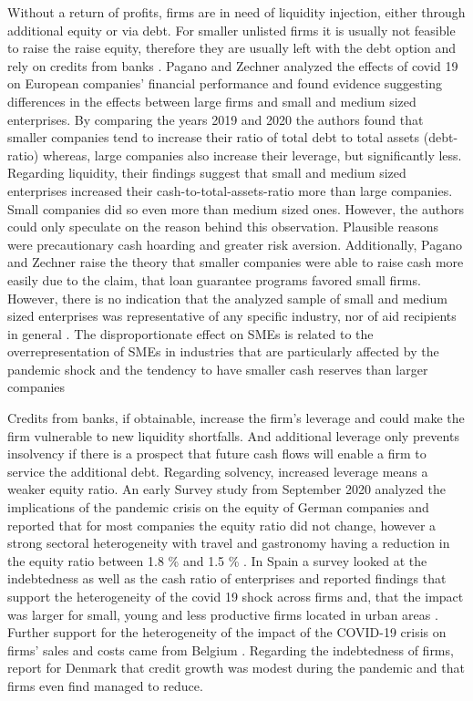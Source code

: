 Without a return of profits, firms are in need of liquidity injection, either through additional equity or via debt. For smaller unlisted firms it is usually not feasible to raise the raise equity, therefore they are usually left with the debt option and rely on credits from banks \parencite{pagano_covid-19_2022}. Pagano and Zechner \parencite*{pagano_covid-19_2022} analyzed the effects of covid 19 on European companies’ financial performance and found evidence suggesting differences in the effects between large firms and small and medium sized enterprises. By comparing the years 2019 and 2020 the authors found that smaller companies tend to increase their ratio of total debt to total assets (debt-ratio) whereas, large companies also increase their leverage, but significantly less. Regarding liquidity, their findings suggest that small and medium sized enterprises increased their cash-to-total-assets-ratio more than large companies. Small companies did so even more than medium sized ones. However, the authors could only speculate on the reason behind this observation. Plausible reasons were precautionary cash hoarding and greater risk aversion. Additionally, Pagano and Zechner raise the theory that smaller companies were able to raise cash more easily due to the claim, that loan guarantee programs favored small firms. However, there is no indication that the analyzed sample of small and medium sized enterprises was representative of any specific industry, nor of aid recipients in general \parencite{oced_one_2021}. 
The disproportionate effect on SMEs is related to the overrepresentation of SMEs in industries that are particularly affected by the pandemic shock and the tendency to have smaller cash reserves than larger companies 


Credits from banks, if obtainable, increase the firm's leverage and could make the firm vulnerable to new liquidity shortfalls. And additional leverage only prevents insolvency if there is a prospect that future cash flows will enable a firm to service the additional debt. Regarding solvency, increased leverage means a weaker equity ratio. An early Survey study from September 2020 analyzed the implications of the pandemic crisis on the equity of German companies and reported that for most companies the equity ratio did not change, however a strong sectoral heterogeneity with travel and gastronomy having a reduction in the equity ratio between 1.8 \% and 1.5 \% \parencite{peichl_eigenkapitalentwicklung_2021}. In Spain a survey looked at the indebtedness as well as the cash ratio of enterprises and reported findings that support the heterogeneity of the covid 19 shock across firms and, that the impact was larger for small, young and less productive firms located in urban areas \parencite{fernandez-cerezo_firm-level_2021}. Further support for the heterogeneity of the impact of the COVID-19 crisis on firms’ sales and costs came from Belgium \parencite{dhyne_belgian_2021}. Regarding the indebtedness of firms, \parencite{julin_firm_2021} report for Denmark that credit growth was modest during the pandemic and that firms even find managed to reduce.

